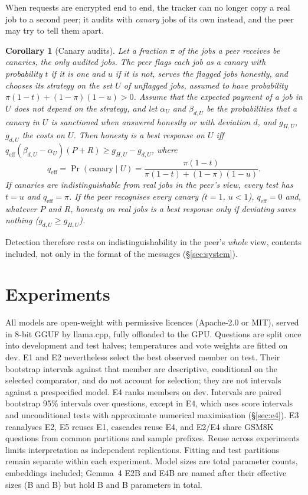 \documentclass[11pt]{article}
\newtheorem{corollary}[theorem]{Corollary}
\theoremstyle{definition}
\theoremstyle{remark}
\begin{document}
When requests are encrypted end to end, the tracker can no longer copy a real job to a second peer; it
audits with \emph{canary} jobs of its own instead, and the peer may try to tell them apart.
\begin{corollary}[Canary audits]\label{cor:canary}
Let a fraction $\pi$ of the jobs a peer receives be canaries, the only audited jobs. The peer flags each
job as a canary with probability $t$ if it is one and $u$ if it is not, serves the flagged jobs honestly,
and chooses its strategy on the set $U$ of unflagged jobs, assumed to have probability
$\pi(1-t)+(1-\pi)(1-u)>0$. Assume that the expected payment of a job in $U$ does not depend on the
strategy, and let $\alpha_U$ and $\beta_{d,U}$ be the probabilities that a canary in $U$ is sanctioned
when answered honestly or with deviation $d$, and $g_{H,U}$, $g_{d,U}$ the costs on $U$. Then honesty is a
best response on $U$ iff $q_{\mathrm{eff}}(\beta_{d,U}-\alpha_U)(P+R)\ge g_{H,U}-g_{d,U}$, where
\[
q_{\mathrm{eff}}=\Pr(\text{canary}\mid U)=\frac{\pi(1-t)}{\pi(1-t)+(1-\pi)(1-u)}.
\]
If canaries are indistinguishable from real jobs in the peer's view, every test has $t=u$ and
$q_{\mathrm{eff}}=\pi$. If the peer recognises every canary ($t=1$, $u<1$), $q_{\mathrm{eff}}=0$ and, whatever
$P$ and $R$, honesty on real jobs is a best response only if deviating saves nothing ($g_{d,U}\ge g_{H,U}$).
\end{corollary}
Detection therefore rests on indistinguishability in the peer's \emph{whole} view, contents included, not
only in the format of the messages (\S\ref{sec:system}).

\section{Experiments}
All models are open-weight with permissive licences (Apache-2.0 or MIT), served in 8-bit GGUF by
llama.cpp, fully offloaded to the GPU. Questions are split once into development and test halves; temperatures and vote
weights are fitted on dev. E1 and E2 nevertheless select the best observed member on test. Their bootstrap intervals
against
that member are descriptive, conditional on the selected comparator, and do not account for selection;
they are not intervals against a prespecified model. E4 ranks members on dev.
Intervals are paired bootstrap 95\% intervals over questions, except in E4, which uses score intervals
and unconditional tests with approximate numerical maximisation (\S\ref{sec:e4}). E3 reanalyses E2,
E5 reuses E1, cascades reuse E4, and E2/E4 share GSM8K questions from common partitions and sample prefixes.
Reuse across experiments limits interpretation as independent replications. Fitting and test partitions
remain separate within each experiment.
Model sizes are total parameter counts, embeddings included; Gemma~4 E2B and E4B are named after their
effective sizes (\eGemmaTwoEffective{}B and \eGemmaFourEffective{}B) but hold \eGemmaTwoTotal{}B and
\eGemmaFourTotal{}B parameters in total.
\end{document}
